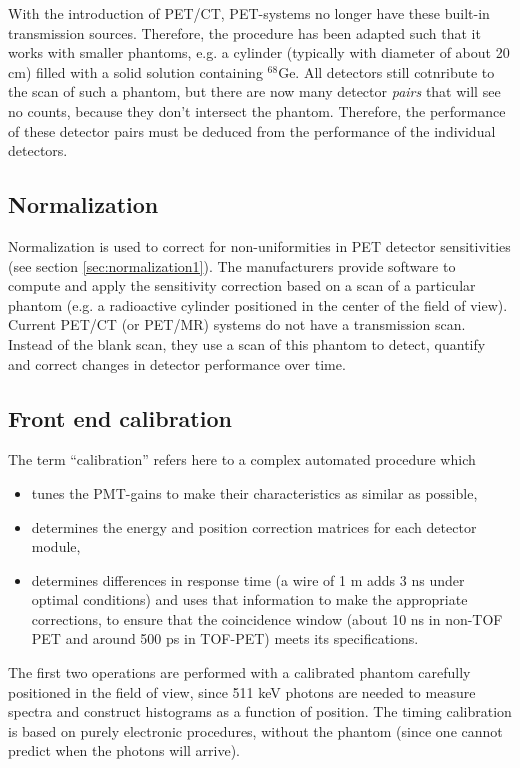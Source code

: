 \documentclass[11pt,oneside]{book}
\begin{document}
With the introduction of PET/CT, PET-systems no longer have these
built-in transmission sources. Therefore, the procedure has been
adapted such that it works with smaller phantoms, e.g. a cylinder
(typically with diameter of about 20 cm) filled with a solid solution
containing $^{68}$Ge. All detectors still cotnribute to the scan of
such a phantom, but there are now many detector {\em pairs} that will
see no counts, because they don't intersect the phantom. Therefore,
the performance of these detector pairs must be deduced from the
performance of the individual detectors.


\subsection{Normalization}
Normalization is used to correct for non-uniformities in PET detector
sensitivities (see section \ref{sec:normalization1}). The
manufacturers provide software to compute and apply the sensitivity
correction based on a scan of a particular phantom (e.g. a radioactive
cylinder positioned in the center of the field of view). Current
PET/CT (or PET/MR) systems do not have a transmission scan. Instead of
the blank scan, they use a scan of this phantom to detect, quantify
and correct changes in detector performance over time.

\subsection{Front end calibration}
The term ``calibration'' refers here to a complex automated procedure
which
\begin{itemize}
  \item tunes the PMT-gains to make their characteristics as similar as
        possible,
  \item determines the energy and position correction matrices for each
        detector module,
  \item determines differences in response time (a wire of 1 m adds 3
        ns under optimal conditions) and uses that information to make
        the appropriate corrections, to ensure that the coincidence
        window (about 10 ns in non-TOF PET and around 500 ps in
        TOF-PET) meets its specifications.
\end{itemize}
The first two operations are performed with a calibrated phantom carefully
positioned in the field of view, since 511 keV photons are needed to measure
spectra and construct histograms as a function of position. The timing
calibration is based on purely electronic procedures, without the phantom
(since one cannot predict when the photons will arrive).
\end{document}
